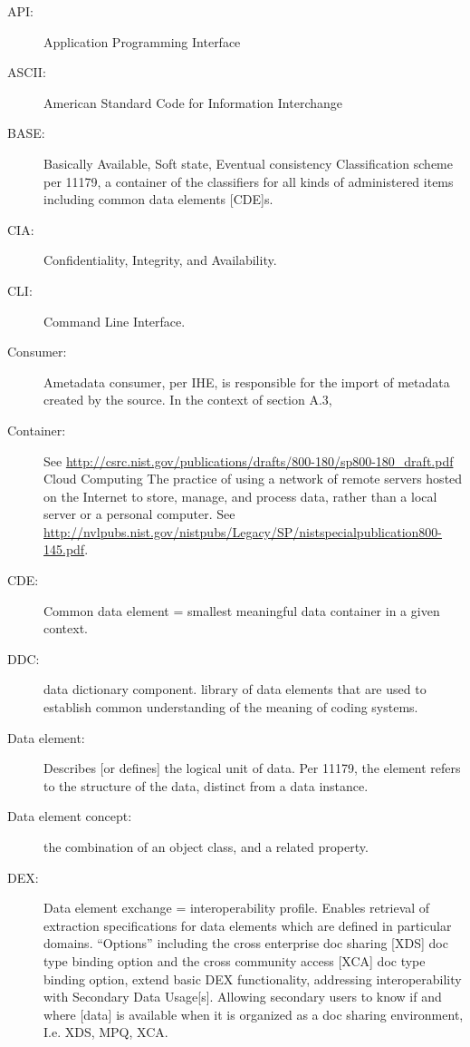 \begin{description}
\item[API:] Application Programming Interface

\item[ASCII:] American Standard Code for Information Interchange

\item[BASE:] Basically Available, Soft state, Eventual consistency
  Classification scheme per 11179, a container of the classifiers for
  all kinds of administered items including common data elements
  [CDE]s.

\item[CIA:] Confidentiality, Integrity, and Availability.

\item[CLI:] Command Line Interface.

\item[Consumer:] Ametadata consumer, per IHE, is responsible for the
  import of metadata created by the source. In the context of section
  A.3,

\item[Container:] See
  \url{http://csrc.nist.gov/publications/drafts/800-180/sp800-180_draft.pdf}
  Cloud Computing The practice of using a network of remote servers
  hosted on the Internet to store, manage, and process data, rather
  than a local server or a personal computer. See
  \url{http://nvlpubs.nist.gov/nistpubs/Legacy/SP/nistspecialpublication800-145.pdf}.

\item[CDE:] Common data element = smallest meaningful data container
  in a given context.

\item[DDC:] data dictionary component. library of data elements that
  are used to establish common understanding of the meaning of coding
  systems.

\item[Data element:] Describes [or defines] the logical unit of
  data. Per 11179, the element refers to the structure of the data,
  distinct from a data instance.

\item[Data element concept:] the combination of an object class, and a
  related property.

\item[DEX:] Data element exchange = interoperability profile. Enables
  retrieval of extraction specifications for data elements which are
  defined in particular domains. “Options” including the cross
  enterprise doc sharing [XDS] doc type binding option and the cross
  community access [XCA] doc type binding option, extend basic DEX
  functionality, addressing interoperability with Secondary Data
  Usage[s]. Allowing secondary users to know if and where [data] is
  available when it is organized as a doc sharing environment,
  I.e. XDS, MPQ, XCA.


\end{description}
